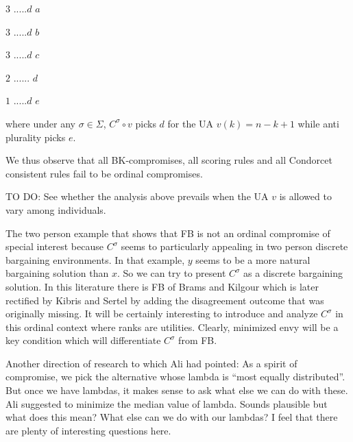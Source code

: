 \documentclass[version=3.21, pagesize, notitlepage, twoside=off, bibliography=totoc, DIV=calc, fontsize=12pt, a4paper]{scrartcl}
\begin{document}
$3$ $.....d$ $a$

$3$ $.....d$ $b$

$3$ $.....d$ $c$

$2$ $......$ $d$

$1$ $.....d$ $e$

\bigskip

where under any $\sigma \in \Sigma $, $C^{\sigma }\circ v$ picks $d$ for the UA $v(k)=n-k+1$ while anti plurality picks $e$.

We thus observe that all BK-compromises, all scoring rules and all Condorcet consistent rules fail to be ordinal compromises.

TO DO: See whether the analysis above prevails when the UA $v$ is allowed to vary among individuals.

The two person example that shows that FB is not an ordinal compromise of special interest because $C^{\sigma }$ seems to particularly appealing in two person discrete bargaining environments. In that example, $y$ seems to be a more natural bargaining solution than $x$. So we can try to present $C^{\sigma }$ as a discrete bargaining solution. In this literature there is FB of Brams and Kilgour which is later rectified by Kibris and Sertel by adding the disagreement outcome that was originally missing. It will be certainly interesting to introduce and analyze $C^{\sigma }$ in this ordinal context where ranks are utilities. Clearly, minimized envy will be a key condition which will differentiate $C^{\sigma }$ from FB.

Another direction of research to which Ali had pointed: As a spirit of compromise, we pick the alternative whose lambda is “most equally distributed”. But once we have lambdas, it makes sense to ask what else we can do with these. Ali suggested to minimize the median value of lambda. Sounds plausible but what does this mean? What else can we do with our lambdas? I feel that there are plenty of interesting questions here.
\end{document}
